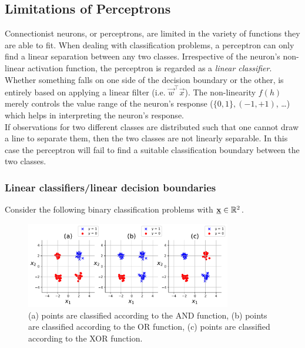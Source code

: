 \subsection{Limitations of Perceptrons}

Connectionist neurons, or perceptrons, are limited in the variety of functions they are able to fit. 
When dealing with classification problems, a perceptron can only find a linear separation between any two classes. Irrespective of the neuron's non-linear activation function, the perceptron is regarded as a \emph{linear classifier}. Whether something falls on one side of the decision boundary or the other, is entirely based on applying a linear filter (i.e. $\vec w^{\top} \vec x$). The non-linearity $f(h)$ merely controls the value range of the neuron's response ($\{0,1\}, (-1,+1)$, \ldots) which helps in interpreting the neuron's response.\\

If observations for two different classes are distributed such that one cannot draw a line to separate them, then the two classes
are not linearly separable. In this case the perceptron will fail to find a suitable classification boundary between the two classes.


\begin{frame}\frametitle{Linear classifiers/linear decision boundaries}

Consider the following binary classification problems with $\underline{\mathbf{x}} \in \mathbb{R}^2$.{}


\begin{figure}[h]
    \centering
	\includegraphics[width=0.8\textwidth]{img/and_or_xor_y}
	\caption{(a) points are classified according to the AND function,
	(b) points are classified according to the OR function,
	(c) points are classified according to the XOR function.
	}
	\label{fig:and_or_xor} 
\end{figure}


\end{frame}

